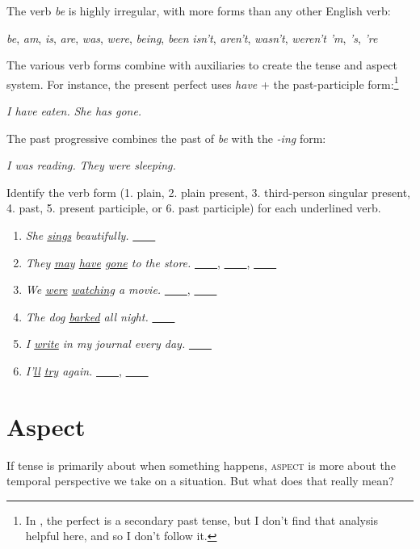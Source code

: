 The verb \textit{be} is highly irregular, with more forms than any other English verb:

\ea
\ea \textit{be}, \textit{am}, \textit{is}, \textit{are}, \textit{was}, \textit{were}, \textit{being}, \textit{been}
\ex \textit{isn't}, \textit{aren't}, \textit{wasn't}, \textit{weren't}
\ex \textit{'m}, \textit{'s}, \textit{'re}
\z\z

The various verb forms combine with auxiliaries to create the tense and aspect system. For instance, the present perfect uses \textit{have} + the past-participle form:\footnote{In \cite{Huddleston2002}, the perfect is a secondary past tense, but I don't find that analysis helpful here, and so I don't follow it.}

\ea \textit{I have eaten.}
\ex \textit{She has gone.}
\z

The past progressive combines the past of \textit{be} with the \textit{-ing} form:

\ea \textit{I was reading.}
\ex \textit{They were sleeping.}
\z{}

\begin{tcolorbox}[title=Exercise: Verb Forms, colback=white, colframe=red!75!black, fonttitle=\bfseries]
Identify the verb form (1. plain, 2. plain present, 3. third-person singular present, 4. past, 5. present participle, or 6. past participle) for each underlined verb.

\begin{enumerate}[nosep]
    \item \textit{She \uline{sings} beautifully.} \hfill\uline{~~~~}
    \item \textit{They \uline{may} \uline{have} \uline{gone} to the store.} \hfill\uline{~~~~},  \uline{~~~~},  \uline{~~~~}
    \item \textit{We \uline{were} \uline{watching} a movie.} \hfill\uline{~~~~},  \uline{~~~~}
    \item \textit{The dog \uline{barked} all night.} \hfill\uline{~~~~}
    \item \textit{I \uline{write} in my journal every day.} \hfill\uline{~~~~}
    \item \textit{I'\uline{ll} \uline{try} again.} \hfill\uline{~~~~},  \uline{~~~~}
\end{enumerate}
\end{tcolorbox}

\section{Aspect}
If tense is primarily about when something happens, \textsc{aspect} is more about the temporal perspective we take on a situation. But what does that really mean?

